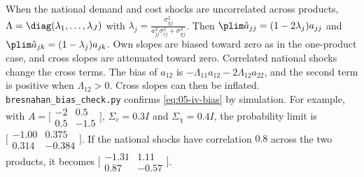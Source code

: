 When the national demand and cost shocks are uncorrelated across products, $\Lambda = \diag(\lambda_1,\dots,\lambda_J)$ with
$\lambda_j = \frac{\sigma_{\chi j}^2}{a_{jj}^2\sigma_{cj}^2 + \sigma_{\chi j}^2}$. Then
$\plim\hat a_{jj} = (1 - 2\lambda_j)a_{jj}$ and $\plim\hat a_{jk} = (1 - \lambda_j)a_{jk}$. Own slopes are biased
toward zero as in the one-product case, and cross slopes are attenuated toward zero. Correlated national shocks
change the cross terms. The bias of $a_{12}$ is $-\Lambda_{11}a_{12} - 2\Lambda_{12}a_{22}$, and the second term is
positive when $\Lambda_{12} > 0$. Cross slopes can then be inflated. \texttt{bresnahan\_bias\_check.py} confirms
\eqref{eq:05-iv-bias} by simulation. For example, with $A = \bigl[\begin{smallmatrix}-2 & 0.5\\ 0.5 & -1.5\end{smallmatrix}\bigr]$,
$\Sigma_c = 0.3I$ and $\Sigma_\chi = 0.4I$, the probability limit is
$\bigl[\begin{smallmatrix}-1.00 & 0.375\\ 0.314 & -0.384\end{smallmatrix}\bigr]$. If the national shocks have
correlation $0.8$ across the two products, it becomes
$\bigl[\begin{smallmatrix}-1.31 & 1.11\\ 0.87 & -0.57\end{smallmatrix}\bigr]$.

